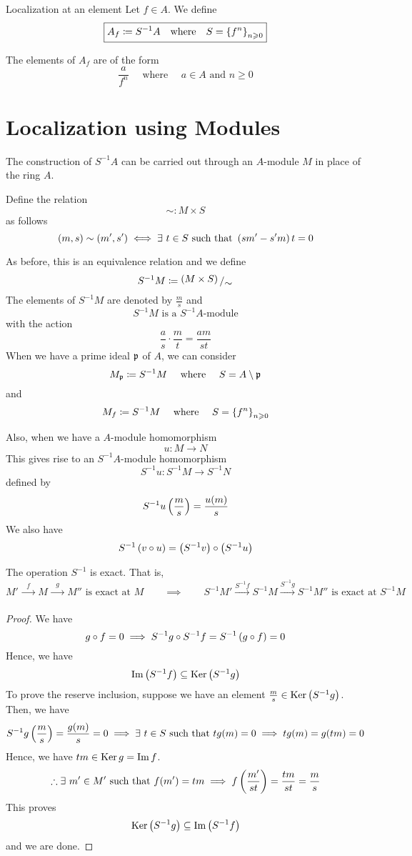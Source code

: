 \begin{defn}{Localization at an element}{}
	Let \(f \in A\).
	We define
	\[
		\boxed{
			A_f \coloneqq S^{-1}A
			\quad \text{where} \quad
			S = \left\{ f^n \right\}_{n \geqslant 0}
		}
	\]
\end{defn}
The elements of \(A_f\) are of the form
\[
	\frac{a}{f^n}
	\quad \text{ where } \quad
	a \in A \text{ and } n \geq 0
\]

\section{Localization using Modules}
The construction of \(S^{-1}A\) can be carried out through an \(A\)-module
\(M\) in place of the ring \(A\).

Define the relation
\[
	\sim \colon M \times S
\]
as follows
\[
	\left( m, s \right) \sim \left( m', s' \right) \iff \exists\ t \in S \text{ such that }
	\left( sm' - s'm \right)t = 0
\]

As before, this is an equivalence relation and we define
\[
	S^{-1}M \coloneqq \bigslant{\brak{M \times S}}{\sim}
\]
The elements of \(S^{-1}M\) are denoted by \(\frac{m}{s}\) and
\[
	S^{-1}M \text{ is a } S^{-1}A\text{-module}
\]
with the action
\[
	\frac{a}{s} \cdot \frac{m}{t} = \frac{am}{st}
\]
When we have a prime ideal \(\mathfrak{p}\) of \(A\), we can consider
\[
	M_{\mathfrak{p}} \coloneqq S^{-1}M \quad \text{ where } \quad
	S = A \setminus \mathfrak{p}
\]
and
\[
	M_f \coloneqq S^{-1}M \quad \text{ where } \quad
	S = \left\{ f^n \right\}_{n \geqslant 0}
\]

Also, when we have a \(A\)-module homomorphism
\[
	u \colon M \to N
\]
This gives rise to an \(S^{-1}A\)-module homomorphism
\[
	S^{-1}u \colon S^{-1}M \to S^{-1}N
\]
defined by
\[
	S^{-1}u \left( \frac{m}{s} \right) = \frac{u(m)}{s}
\]
We also have
\[
	S^{-1} \left( v \circ u \right) = \left( S^{-1}v \right) \circ \left( S^{-1}u \right)
\]


\begin{proposition}{}{}
	The operation \(S^{-1}\) is exact.
	That is,
	\[
		M' \xrightarrow[\quad\quad]{f} M \xrightarrow[\quad\quad]{g} M''
		\text{ is exact at } M \qquad\implies\qquad
		S^{-1}M' \xrightarrow[\quad\quad]{S^{-1}f} S^{-1}M
		\xrightarrow[\quad\quad]{S^{-1}g} S^{-1}M'' \text{ is exact at }
		S^{-1}M
	\]
\end{proposition}
\begin{proof}
	We have
	\[
		g \circ f = 0 \implies S^{-1}g \circ S^{-1}f
		= S^{-1}\left( g \circ f \right) = 0
	\]
	Hence, we have
	\[
		\operatorname{Im} \left( S^{-1}f \right) \subseteq \operatorname{Ker} \left( S^{-1}g \right)
	\]
	To prove the reserve inclusion, suppose we have an element
	\(\frac{m}{s} \in \operatorname{Ker} \left( S^{-1}g \right)\).
	Then, we have
	\[
		S^{-1}g \left( \frac{m}{s} \right) = \frac{g(m)}{s} = 0
		\implies \exists\ t \in S \text{ such that }
		tg(m) = 0 \implies tg(m) = g(tm) = 0
	\]
	Hence, we have \(tm \in \operatorname{Ker} g = \operatorname{Im} f\).
	\[
		\therefore \exists\ m' \in M' \text{ such that }
		f(m') = tm \implies f\left( \frac{m'}{st} \right) = \frac{tm}{st}
		= \frac{m}{s}
	\]
	This proves
	\[
		\operatorname{Ker} \left( S^{-1}g \right) \subseteq \operatorname{Im} \left( S^{-1}f \right)
	\]
	and we are done.
\end{proof}

